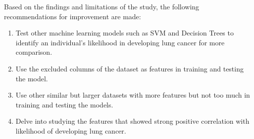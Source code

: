 \documentclass[runningheads]{llncs}
\begin{document}
Based on the findings and limitations of the study, the following recommendations for improvement are made:
\begin{enumerate}
\item Test other machine learning models such as SVM and Decision Trees to identify an individual’s likelihood in developing lung cancer for more comparison. 
\item Use the excluded columns of the dataset as features in training and testing the model.
\item Use other similar but larger datasets with more features but not too much in training and testing the models.
\item Delve into studying the features that showed strong positive correlation with likelihood of developing lung cancer.
\end{enumerate}



\end{document}
